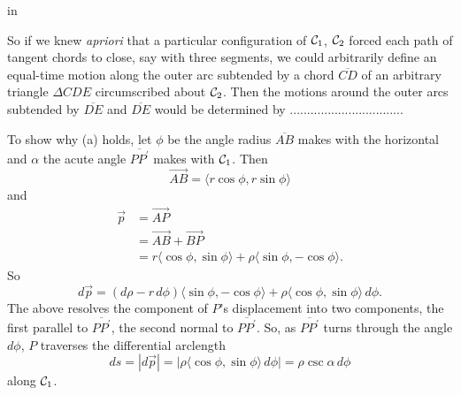 \documentclass{ximera}
\newcommand{\pskip}{\vskip 0.1 in}
\begin{document}


\begin{onlineOnly}
    \begin{center}
\end{center}
\end{onlineOnly}

\pskip

So if we knew \emph{apriori} that a particular configuration of ${\cal C}_1$, ${\cal C}_2$ forced each path of tangent chords to close, say with three segments, we could arbitrarily define an equal-time motion along the outer arc subtended by a chord $\overline{CD}$ of an arbitrary triangle $\Delta CDE$ circumscribed about ${\cal C}_2$. Then the motions around the outer arcs subtended by $\overline{DE}$ and $\overline{DE}$ would be determined by .................................


To show why (a) holds, let $\phi$ be the angle radius $\overline{AB}$ makes with the horizontal and $\alpha$ the acute angle $\overline{PP^\prime}$ makes with ${\cal C}_1$. Then 
\[
      \overrightarrow{AB} = \langle r\cos \phi, r\sin\phi \rangle
\]
and
\begin{align*}
    \overrightarrow{p} &= \overrightarrow{AP}   \\
                                &= \overrightarrow{AB}+\overrightarrow{BP} \\
                                &= r\langle \cos \phi, \sin \phi \rangle + \rho \langle \sin\phi, -\cos\phi  \rangle . 
\end{align*}
So
\[
    d\overrightarrow{p} = (d\rho - r \, d\phi ) \langle \sin \phi, -\cos \phi \rangle+ \rho \langle \cos\phi, \sin\phi \rangle \, d\phi .
\]
The above resolves the component of $P$'s displacement into two components, the first parallel to $\overline{PP^\prime}$, the second normal to $\overline{PP^\prime}$. So, as $\overline{PP^\prime}$ turns through the angle $d\phi$, $P$ traverses the differential arclength
\[
   ds = |d\overrightarrow{p}| = |  \rho \langle \cos\phi, \sin\phi \rangle \, d\phi |    = \rho \csc \alpha \, d\phi
\]
along ${\cal C}_1$. 
\end{document}
